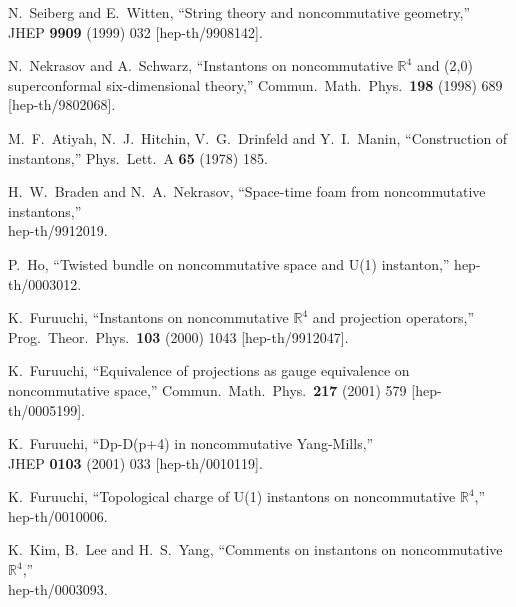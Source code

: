 \documentclass[a4paper,11pt]{article}
\numberwithin{equation}{section}
\newcommand{\R}{\mathbb R}
\begin{document}
{\begin{thebibliography}{99}
N.~Seiberg and E.~Witten,
``String theory and noncommutative geometry,''\\
JHEP {\bf 9909} (1999) 032
[hep-th/9908142].

N.~Nekrasov and A.~Schwarz,
``Instantons on noncommutative $\R^4$ and (2,0) superconformal 
  six-dimensional theory,''
Commun.\ Math.\ Phys.\  {\bf 198} (1998) 689
[hep-th/9802068].

M.~F.~Atiyah, N.~J.~Hitchin, V.~G.~Drinfeld and Y.~I.~Manin,
``Construction of instantons,''
Phys.\ Lett.\ A {\bf 65} (1978) 185.

H.~W.~Braden and N.~A.~Nekrasov,
``Space-time foam from noncommutative instantons,''\\
hep-th/9912019.

P.~Ho,
``Twisted bundle on noncommutative space and U(1) instanton,''
hep-th/0003012.

K.~Furuuchi,
``Instantons on noncommutative $\R^4$ and projection operators,''\\
Prog.\ Theor.\ Phys.\  {\bf 103} (2000) 1043
[hep-th/9912047].

K.~Furuuchi,
``Equivalence of projections as gauge equivalence on noncommutative space,''
Commun.\ Math.\ Phys.\  {\bf 217} (2001) 579
[hep-th/0005199].

K.~Furuuchi,
``Dp-D(p+4) in noncommutative Yang-Mills,''\\
JHEP {\bf 0103} (2001) 033
[hep-th/0010119].

K.~Furuuchi,
``Topological charge of U(1) instantons on noncommutative $\R^4$,''
hep-th/0010006.

K.~Kim, B.~Lee and H.~S.~Yang,
``Comments on instantons on noncommutative $\R^4$,''\\
hep-th/0003093.


\end{thebibliography}}
\end{document}
